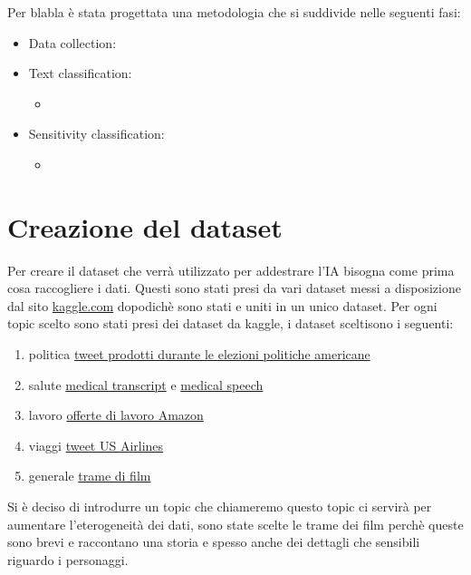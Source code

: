 Per blabla è stata progettata una metodologia che si suddivide nelle seguenti fasi:
\begin{itemize}
    \item Data collection:
    \item Text classification:
        \begin{itemize}
            \item 
        \end{itemize}
    \item Sensitivity classification:
        \begin{itemize}
            \item 
        \end{itemize}
\end{itemize}
\section{Creazione del dataset}
Per creare il dataset che verrà utilizzato per addestrare l'IA bisogna come prima cosa raccogliere i dati. Questi sono stati presi da vari dataset messi a disposizione dal sito \href{https://www.kaggle.com/}{kaggle.com} dopodichè sono stati  e uniti in un unico dataset.
Per ogni topic scelto sono stati presi dei dataset da kaggle, i dataset sceltisono i seguenti:
\begin{enumerate}
    \item politica \href{https://www.kaggle.com/kinguistics/election-day-tweets#election_day_tweets.csv}{tweet prodotti durante le elezioni politiche americane}
    \item salute \href{https://www.kaggle.com/tboyle10/medicaltranscriptions}{medical transcript} e \href{https://www.kaggle.com/paultimothymooney/medical-speech-transcription-and-intent#overview-of-recordings.csv}{medical speech}
    \item lavoro \href{https://www.kaggle.com/atahmasb/amazon-job-skills}{offerte di lavoro Amazon}
    \item viaggi \href{https://www.kaggle.com/crowdflower/twitter-airline-sentiment#Tweets.csv}{tweet US Airlines}
    \item generale \href{https://www.kaggle.com/rounakbanik/the-movies-dataset#movies_metadata.csv}{trame di film}
\end{enumerate}
Si è deciso di introdurre un topic che chiameremo  questo topic ci servirà per aumentare l'eterogeneità dei dati, sono state scelte le trame dei film perchè queste sono brevi e raccontano una storia e spesso anche dei dettagli che sensibili riguardo i personaggi.
